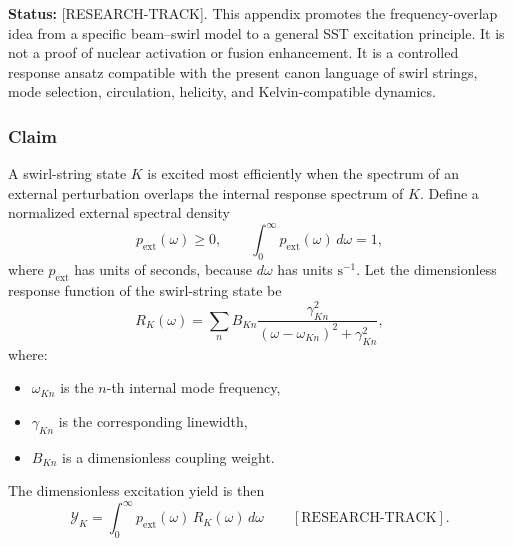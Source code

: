         \noindent
        \textbf{Status:} [RESEARCH-TRACK].
        This appendix promotes the frequency-overlap idea from a specific beam--swirl model to a general SST excitation principle. It is not a proof of nuclear activation or fusion enhancement. It is a controlled response ansatz compatible with the present canon language of swirl strings, mode selection, circulation, helicity, and Kelvin-compatible dynamics.
    
    \subsubsection*{Claim}
        
        A swirl-string state \(K\) is excited most efficiently when the spectrum of an external perturbation overlaps the internal response spectrum of \(K\). Define a normalized external spectral density
        \begin{equation}
            p_{\mathrm{ext}}(\omega)\ge 0,
            \qquad
            \int_0^\infty p_{\mathrm{ext}}(\omega)\,d\omega = 1,
            \label{eq:p_ext_normalized}
        \end{equation}
        where \(p_{\mathrm{ext}}\) has units of seconds, because \(d\omega\) has units \(\mathrm{s}^{-1}\). Let the dimensionless response function of the swirl-string state be
        \begin{equation}
            R_K(\omega)
            =
            \sum_{n}
            B_{Kn}
            \frac{\gamma_{Kn}^{2}}
            {(\omega-\omega_{Kn})^{2}+\gamma_{Kn}^{2}},
            \label{eq:RK_lorentzian}
        \end{equation}
        where:
        \begin{itemize}
            \item \(\omega_{Kn}\) is the \(n\)-th internal mode frequency,
            \item \(\gamma_{Kn}\) is the corresponding linewidth,
            \item \(B_{Kn}\) is a dimensionless coupling weight.
        \end{itemize}
        
        The dimensionless excitation yield is then
        \begin{equation}
            \boxed{
                \mathcal{Y}_K
                =
                \int_0^\infty
                p_{\mathrm{ext}}(\omega)\,
                R_K(\omega)\,
                d\omega
            }
            \qquad
            [\mathrm{RESEARCH\text{-}TRACK}].
            \label{eq:SST_resonance_yield}
        \end{equation}
    
